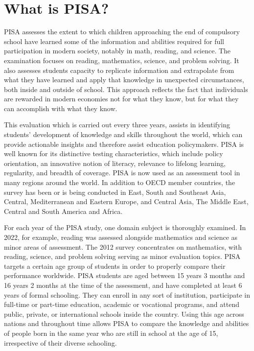 \section{What is PISA?}\label{what-is-pisa}

PISA assesses the extent to which children approaching the end of compulsory school have learned some of the information and abilities required for full participation in modern society, notably in math, reading, and science. The examination focuses on reading, mathematics, science, and problem solving. It also assesses students capacity to replicate information and extrapolate from what they have learned and apply that knowledge in unexpected circumstances, both inside and outside of school. This approach reflects the fact that individuals are rewarded in modern economies not for what they know, but for what they can accomplish with what they know.

This evaluation which is carried out every three years, assists in identifying students' development of knowledge and skills throughout the world, which can provide actionable insights and therefore assist education policymakers. PISA is well known for its distinctive testing characteristics, which include policy orientation, an innovative notion of literacy, relevance to lifelong learning, regularity, and breadth of coverage. PISA is now used as an assessment tool in many regions around the world. In addition to OECD member countries, the survey has been or is being conducted in East, South and Southeast Asia, Central, Mediterranean and Eastern Europe, and Central Asia, The Middle East, Central and South America and Africa. \citep{pisabook}

For each year of the PISA study, one domain subject is thoroughly examined. In 2022, for example, reading was assessed alongside mathematics and science as minor areas of assessment. The 2012 survey concentrates on mathematics, with reading, science, and problem solving serving as minor evaluation topics. PISA targets a certain age group of students in order to properly compare their performance worldwide. PISA students are aged between 15 years 3 months and 16 years 2 months at the time of the assessment, and have completed at least 6 years of formal schooling. They can enroll in any sort of institution, participate in full-time or part-time education, academic or vocational programs, and attend public, private, or international schools inside the country. Using this age across nations and throughout time allows PISA to compare the knowledge and abilities of people born in the same year who are still in school at the age of 15, irrespective of their diverse schooling. \citep{pisabook}

